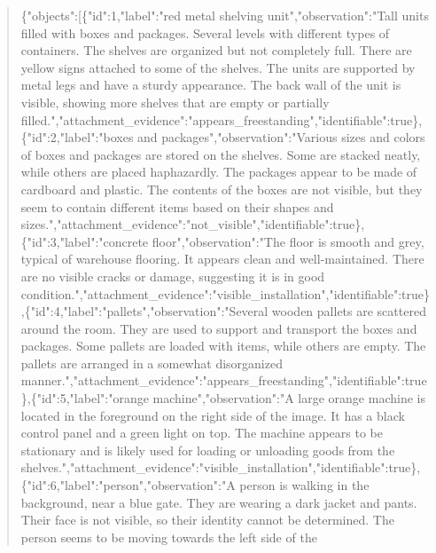 \documentclass[10pt,a4paper]{article}
\begin{document}
\begin{quote}
\{"objects":\allowbreak{}[\{"id":\allowbreak{}1,\allowbreak{}"label":\allowbreak{}"red\allowbreak{} metal shelving unit",\allowbreak{}"observation":\allowbreak{}"Tall units filled with boxes and packages. Several levels with different types of containers. The shelves are organized but not completely full. There are yellow signs attached to some of the shelves. The units are supported by metal legs and have a sturdy appearance. The back wall of the unit is visible,\allowbreak{} showing more shelves that are empty or partially filled.",\allowbreak{}"attachment\_evidence":\allowbreak{}"\allowbreak{}appears\_freestanding",\allowbreak{}"identifia\allowbreak{}ble":\allowbreak{}true\},\allowbreak{}\{"id":\allowbreak{}2,\allowbreak{}"label":\allowbreak{}"boxe\allowbreak{}s and packages",\allowbreak{}"observation":\allowbreak{}"Various\allowbreak{} sizes and colors of boxes and packages are stored on the shelves. Some are stacked neatly,\allowbreak{} while others are placed haphazardly. The packages appear to be made of cardboard and plastic. The contents of the boxes are not visible,\allowbreak{} but they seem to contain different items based on their shapes and sizes.",\allowbreak{}"attachment\_evidence":\allowbreak{}"n\allowbreak{}ot\_visible",\allowbreak{}"identifiable":\allowbreak{}true\}\allowbreak{},\allowbreak{}\{"id":\allowbreak{}3,\allowbreak{}"label":\allowbreak{}"concrete floor",\allowbreak{}"observation":\allowbreak{}"The floor is smooth and grey,\allowbreak{} typical of warehouse flooring. It appears clean and well-maintained. There are no visible cracks or damage,\allowbreak{} suggesting it is in good condition.",\allowbreak{}"attachment\_evidence\allowbreak{}":\allowbreak{}"visible\_installation",\allowbreak{}"identi\allowbreak{}fiable":\allowbreak{}true\},\allowbreak{}\{"id":\allowbreak{}4,\allowbreak{}"label":\allowbreak{}"p\allowbreak{}allets",\allowbreak{}"observation":\allowbreak{}"Several wooden pallets are scattered around the room. They are used to support and transport the boxes and packages. Some pallets are loaded with items,\allowbreak{} while others are empty. The pallets are arranged in a somewhat disorganized manner.",\allowbreak{}"attachment\_evidence":\allowbreak{}"\allowbreak{}appears\_freestanding",\allowbreak{}"identifia\allowbreak{}ble":\allowbreak{}true\},\allowbreak{}\{"id":\allowbreak{}5,\allowbreak{}"label":\allowbreak{}"oran\allowbreak{}ge machine",\allowbreak{}"observation":\allowbreak{}"A large orange machine is located in the foreground on the right side of the image. It has a black control panel and a green light on top. The machine appears to be stationary and is likely used for loading or unloading goods from the shelves.",\allowbreak{}"attachment\_evidence":\allowbreak{}\allowbreak{}"visible\_installation",\allowbreak{}"identifi\allowbreak{}able":\allowbreak{}true\},\allowbreak{}\{"id":\allowbreak{}6,\allowbreak{}"label":\allowbreak{}"per\allowbreak{}son",\allowbreak{}"observation":\allowbreak{}"A person is walking in the background,\allowbreak{} near a blue gate. They are wearing a dark jacket and pants. Their face is not visible,\allowbreak{} so their identity cannot be determined. The person seems to be moving towards the left side of the 
\end{quote}
\end{document}
